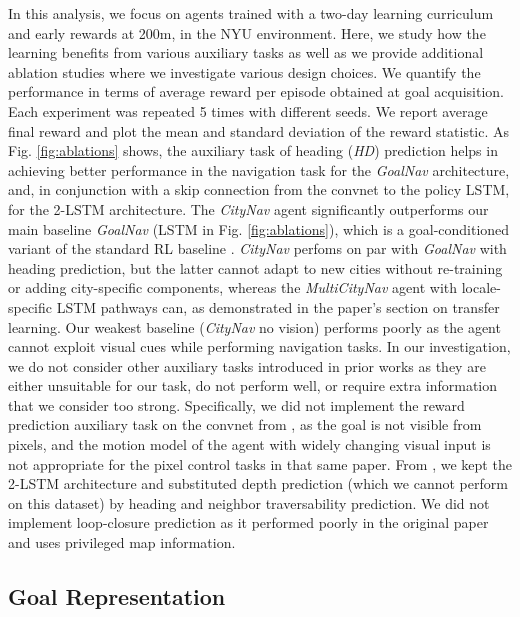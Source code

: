In this analysis, we focus on agents trained with a two-day learning curriculum and early rewards at 200m, in the NYU environment. Here, we study how the learning benefits from various auxiliary tasks as well as we provide additional ablation studies where we investigate various design choices. We quantify the performance in terms of average reward per episode obtained at goal acquisition.
Each experiment was repeated 5 times with different seeds. We report average final reward and plot the mean and standard deviation of the reward statistic.
As Fig. \ref{fig:ablations} shows, the auxiliary task of heading (\emph{HD}) prediction helps in achieving better performance in the navigation task for the \emph{GoalNav} architecture, and, in conjunction with a skip connection from the convnet to the policy LSTM, for the 2-LSTM architecture. The \emph{CityNav} agent significantly outperforms our main baseline \emph{GoalNav} (LSTM in Fig. \ref{fig:ablations}), which is a goal-conditioned variant of the standard RL baseline \cite{mnih2016asynchronous}. \emph{CityNav} perfoms on par with \emph{GoalNav} with heading prediction, but the latter cannot adapt to new cities without re-training or adding city-specific components, whereas the \emph{MultiCityNav} agent with locale-specific LSTM pathways can, as demonstrated in the paper's section on transfer learning. Our weakest baseline (\emph{CityNav} no vision) performs poorly as the agent cannot exploit visual cues while performing navigation tasks.
In our investigation, we do not consider other auxiliary tasks introduced in prior works \cite{jaderberg2016reinforcement, mirowski2016learning} as they are either unsuitable for our task, do not perform well, or require extra information that we consider too strong. Specifically, we did not implement the reward prediction auxiliary task on the convnet from \cite{jaderberg2016reinforcement}, as the goal is not visible from pixels, and the motion model of the agent with widely changing visual input is not appropriate for the pixel control tasks in that same paper. From \cite{mirowski2016learning}, we kept the 2-LSTM architecture and substituted depth prediction (which we cannot perform on this dataset) by heading and neighbor traversability prediction. We did not implement loop-closure prediction as it performed poorly in the original paper and uses privileged map information.

\subsection{Goal Representation}
\label{supp:goal}


